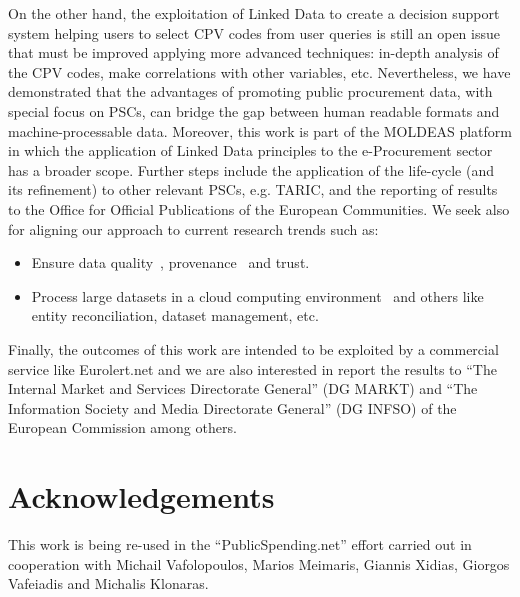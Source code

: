 \documentclass[preprint,12pt]{elsarticle}
\begin{document}
On the other hand, the exploitation of Linked Data to create a decision support system helping users to select CPV codes 
from user queries is still an open issue that must be improved applying more advanced techniques: in-depth analysis of the CPV codes, 
make correlations with other variables, etc. Nevertheless, we have demonstrated that the advantages of promoting public procurement 
data, with special focus on PSCs, can bridge the gap between human readable formats and machine-processable data. Moreover, 
this work is part of the MOLDEAS platform in which the application of Linked Data principles to the e-Procurement sector has a broader scope. 
Further steps include the application of the life-cycle (and its refinement) to other relevant PSCs, e.g. TARIC, and the reporting 
of results to the Office for Official Publications of the European Communities. We seek also for aligning our approach to current 
research trends such as:
\begin{itemize}
 \item Ensure data quality~\cite{lodq}, provenance~\cite{DBLP:conf/ipaw/HartigZ10} and trust.
 \item Process large datasets in a cloud computing environment~\cite{DBLP:conf/closer/HausenblasGHC12}
 and others like entity reconciliation, dataset management, etc.
\end{itemize}

Finally, the outcomes of this work are intended to be exploited by a commercial service like 
Eurolert.net and we are also interested in report the results to ``The 
Internal Market and Services Directorate General'' (DG MARKT) and ``The Information Society and Media Directorate General'' 
(DG INFSO) of the European Commission among others.


\section{Acknowledgements}
This work is being re-used in the ``PublicSpending.net'' effort carried out in cooperation with Michail Vafolopoulos, Marios Meimaris, Giannis Xidias,
Giorgos Vafeiadis and Michalis Klonaras.

\clearpage



\end{document}
